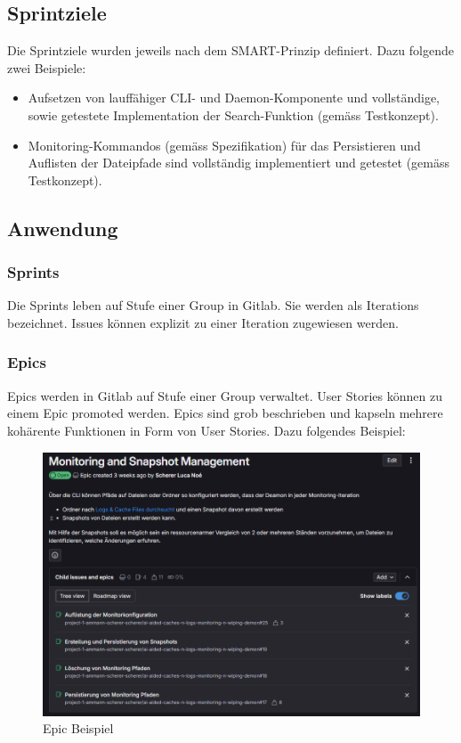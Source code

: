\documentclass[a4paper,12pt]{report}
\begin{document}
    \subsection{Sprintziele}
    Die Sprintziele wurden jeweils nach dem SMART-Prinzip definiert.
    Dazu folgende zwei Beispiele:
    \begin{itemize}
        \item Aufsetzen von lauffähiger CLI- und Daemon-Komponente und vollständige, sowie getestete Implementation der Search-Funktion (gemäss Testkonzept).
        \item Monitoring-Kommandos (gemäss Spezifikation) für das Persistieren und Auflisten der Dateipfade sind vollständig implementiert und getestet (gemäss Testkonzept).
    \end{itemize}

    \subsection{Anwendung}

    \subsubsection{Sprints}
    Die Sprints leben auf Stufe einer Group in Gitlab.
    Sie werden als Iterations bezeichnet.
    Issues können explizit zu einer Iteration zugewiesen werden.

    \clearpage

    \subsubsection{Epics}
    Epics werden in Gitlab auf Stufe einer Group verwaltet.
    User Stories können zu einem Epic promoted werden.
    Epics sind grob beschrieben und kapseln mehrere kohärente Funktionen in Form von User Stories.
    Dazu folgendes Beispiel:
    \begin{figure}[h]
        \centering
        \includegraphics[width=1\textwidth]{assets/epic-example}
        \caption{Epic Beispiel}
        \label{fig:epic-example}
    \end{figure}
\end{document}
